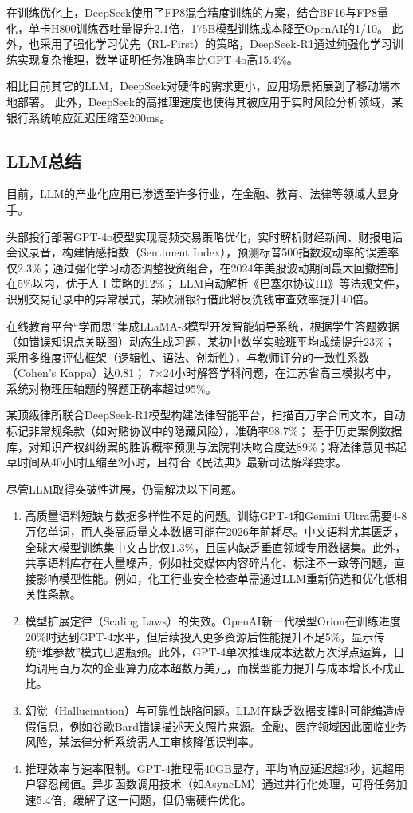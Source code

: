 在训练优化上，DeepSeek使用了FP8混合精度训练的方案，结合BF16与FP8量化，单卡H800训练吞吐量提升2.1倍，175B模型训练成本降至OpenAI的1/10。
此外，也采用了​强化学习优先（RL-First）​的策略，DeepSeek-R1通过纯强化学习训练实现复杂推理，数学证明任务准确率比GPT-4o高15.4\%。

相比目前其它的LLM，DeepSeek对硬件的需求更小，应用场景拓展到了移动端本地部署。
此外，DeepSeek的高推理速度也使得其被应用于实时风险分析领域，某银行系统响应延迟压缩至200ms。
\subsection{LLM总结}
目前，LLM的产业化应用已渗透至许多行业，在金融、教育、法律等领域大显身手。

头部投行部署GPT-4o模型实现高频交易策略优化，实时解析财经新闻、财报电话会议录音，构建情感指数（Sentiment Index），预测标普500指数波动率的误差率仅2.3\%；
​通过强化学习动态调整投资组合，在2024年美股波动期间最大回撤控制在5\%以内，优于人工策略的12\%；
LLM自动解析《巴塞尔协议III》等法规文件，识别交易记录中的异常模式，某欧洲银行借此将反洗钱审查效率提升40倍。

在线教育平台“学而思”集成LLaMA-3模型开发智能辅导系统，根据学生答题数据（如错误知识点关联图）动态生成习题，某初中数学实验班平均成绩提升23\%；
采用多维度评估框架（逻辑性、语法、创新性），与教师评分的一致性系数（Cohen's Kappa）达0.81；
7×24小时解答学科问题，在江苏省高三模拟考中，系统对物理压轴题的解题正确率超过95\%。

某顶级律所联合DeepSeek-R1模型构建法律智能平台，扫描百万字合同文本，自动标记非常规条款（如对赌协议中的隐藏风险），准确率98.7\%；
基于历史案例数据库，对知识产权纠纷案的胜诉概率预测与法院判决吻合度达89\%；将法律意见书起草时间从40小时压缩至2小时，且符合《民法典》最新司法解释要求。

尽管LLM取得突破性进展，仍需解决以下问题。
\begin{enumerate}[nosep]
\item ​高质量语料短缺与数据多样性不足的问题。训练GPT-4和Gemini Ultra需要4-8万亿单词，而人类高质量文本数据可能在2026年前耗尽。中文语料尤其匮乏，全球大模型训练集中文占比仅1.3\%，且国内缺乏垂直领域专用数据集。此外，共享语料库存在大量噪声，例如社交媒体内容碎片化、标注不一致等问题，直接影响模型性能。例如，化工行业安全检查单需通过LLM重新筛选和优化低相关性条款。
\item 模型扩展定律（Scaling Laws）的失效。OpenAI新一代模型Orion在训练进度20\%时达到GPT-4水平，但后续投入更多资源后性能提升不足5\%，显示传统“堆参数”模式已遇瓶颈。此外，GPT-4单次推理成本达数万次浮点运算，日均调用百万次的企业算力成本超数万美元，而模型能力提升与成本增长不成正比。
\item 幻觉（Hallucination）与可靠性缺陷问题。LLM在缺乏数据支撑时可能编造虚假信息，例如谷歌Bard错误描述天文照片来源。金融、医疗领域因此面临业务风险，某法律分析系统需人工审核降低误判率。
\item 推理效率与速率限制。GPT-4推理需40GB显存，平均响应延迟超3秒，远超用户容忍阈值。异步函数调用技术（如AsyncLM）通过并行化处理，可将任务加速5.4倍，缓解了这一问题，但仍需硬件优化。
\end{enumerate}
